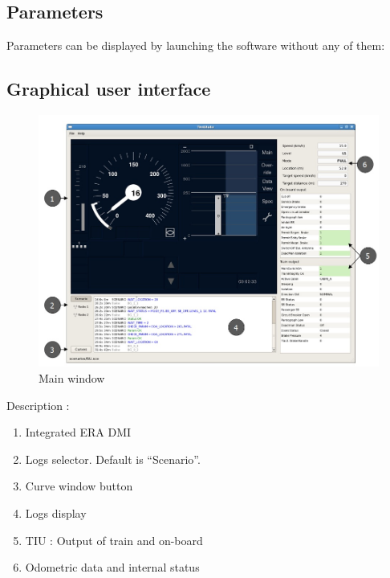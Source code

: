 \documentclass{template/openetcs}
\begin{document}
\subsection{Parameters}
Parameters can be displayed by launching the software without any of them:
\newline
{}
\newpage
\subsection{Graphical user interface}
\begin{figure}[!h]
  \centering
  \includegraphics[width=\textwidth]{image/test_runner_GUI}
  \caption{Main window}
  \label{fig:Main window}
\end{figure}
Description : 
\begin{enumerate}
\item Integrated ERA DMI
\item Logs selector. Default is “Scenario”.
\item Curve window button
\item Logs display
\item TIU : Output of train and on-board
\item Odometric data and internal status
\end{enumerate}
\newpage
\end{document}

